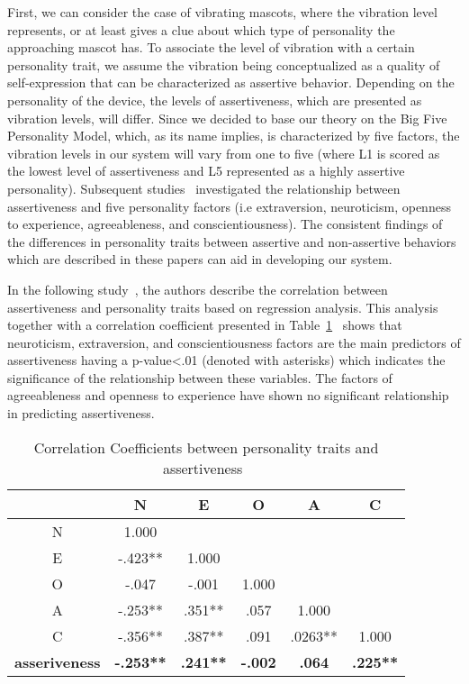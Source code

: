 First, we can consider the case of vibrating mascots, where the vibration level
represents, or at least gives a clue about which type of personality the approaching mascot has.
To associate the level of vibration with a certain personality trait,
we assume the vibration being conceptualized as a quality of self-expression
that can be characterized as assertive behavior.
Depending on the personality of the device, the levels of assertiveness,
which are presented as vibration levels, will differ.
Since we decided to base our theory on the Big Five Personality Model, which, as its name implies, is characterized
by five factors, the vibration levels in our system will vary from one to five (where L1 is scored
as the lowest level of assertiveness and L5 represented as a highly assertive personality).
Subsequent studies~\cite{bagherian2016relationship,kirst2011investigating,ramanaiah1993neo,lefevre1981assertiveness}
investigated the relationship between assertiveness and five personality factors (i.e extraversion, neuroticism,
openness to experience, agreeableness, and conscientiousness).
The consistent findings of the differences in personality traits between assertive and
non-assertive behaviors which are described in these papers can aid in developing our system.

In the following study~\cite{bagherian2016relationship}, the authors describe the correlation between
assertiveness and personality traits based on regression analysis.
This analysis together with a correlation coefficient
presented in Table~\ref{table:assertiveness}~\cite{bagherian2016relationship} shows that neuroticism,
extraversion, and conscientiousness factors are the main predictors of assertiveness
having a p-value\textless .01 (denoted with asterisks) which indicates the significance of the
relationship between these variables.
The factors of agreeableness and openness to experience have shown
no significant relationship in predicting assertiveness.

\begin{table} [h]
\centering
\begin{tabular}{c c c c c c} 
\\
 \hline \hline
						& \textbf{N} 			&\textbf{E}		&\textbf{O}		&\textbf{A}		&\textbf{C}	\\ [0.5ex]
 \hline
 N 						& 1.000 				&				&				&				&	\\ 
 E 						& -.423** 			&1.000			&				&				&	\\
 O 						& -.047 			&-.001			&1.000			&				&	\\
 A 						& -.253** 			&.351**			&.057			&1.000			&	\\
 C 						& -.356** 			&.387**			&.091			&.0263**		&1.000	\\ [1ex]
 \hline
 \textbf{asseriveness}  		& \textbf{-.253**}		&\textbf{.241**}	&\textbf{-.002}		&\textbf{.064}		&\textbf{.225**}	\\
 \hline \hline
 \end{tabular}
\caption[]{Correlation Coefficients between personality traits and assertiveness~\cite{bagherian2016relationship}\footnotemark}
 \label{table:assertiveness}
 \end{table}
 
